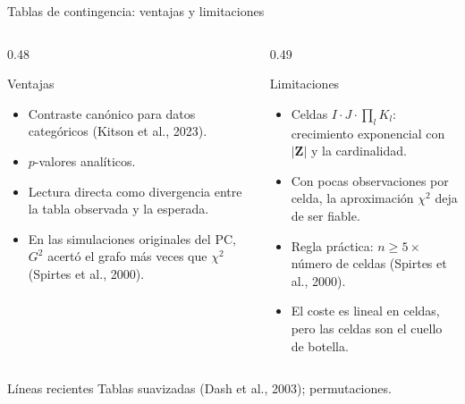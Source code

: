\documentclass[aspectratio=169,11pt]{beamer}
\newcommand{\srccite}[1]{{\scriptsize\color{upmgray}(#1)}}
\begin{document}
\begin{frame}[t]{Tablas de contingencia: ventajas y limitaciones}
  \begin{columns}[T,onlytextwidth]
    \begin{column}{0.48\textwidth}
      \begin{block}{Ventajas}
        \begin{itemize}
          \item Contraste canónico para datos categóricos
                \srccite{Kitson et al., 2023}.
          \item $p$-valores analíticos.
          \item Lectura directa como divergencia entre la tabla observada y la
                esperada.
          \item En las simulaciones originales del PC, $G^2$ acertó el grafo
                más veces que $\chi^2$ \srccite{Spirtes et al., 2000}.
        \end{itemize}
      \end{block}
    \end{column}
    \begin{column}{0.49\textwidth}
      \begin{alertblock}{Limitaciones}
        \begin{itemize}
          \item Celdas $I\cdot J\cdot\prod_l K_l$: crecimiento exponencial con
                $|\mathbf Z|$ y la cardinalidad.
          \item Con pocas observaciones por celda, la aproximación $\chi^2$
                deja de ser fiable.
          \item Regla práctica: $n\ge 5\times$ número de celdas
                \srccite{Spirtes et al., 2000}.
          \item El coste es lineal en celdas, pero las celdas son el cuello de
                botella.
        \end{itemize}
      \end{alertblock}
    \end{column}
  \end{columns}
  \vspace{0.1cm}
  \begin{exampleblock}{Líneas recientes}
    Tablas suavizadas (Dash et al., 2003); permutaciones.
  \end{exampleblock}
\end{frame}

\end{document}
